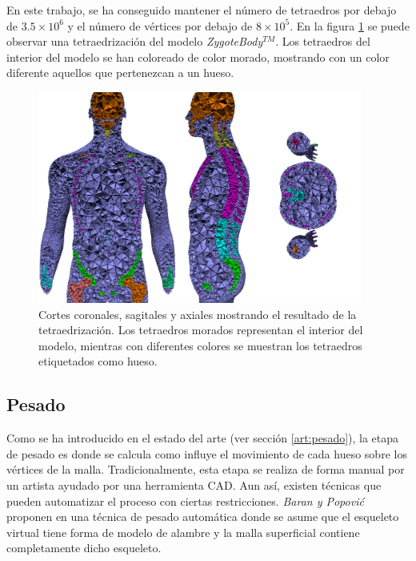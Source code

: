 En este trabajo, se ha conseguido mantener el número de tetraedros por debajo de $3.5\times 10^6$ y el número de vértices por debajo de $8 \times 10^5$. 
En la figura \ref{fig:tetra} se puede observar una tetraedrización del modelo \emph{ZygoteBody}$^{TM}$. Los tetraedros del interior del modelo se han coloreado de color morado, mostrando con un color diferente aquellos que pertenezcan a un hueso.
%
\begin{figure}[th]
   \centering
    \includegraphics[width=0.95\textwidth]{IMG/boneid.png}
     \caption{Cortes coronales, sagitales y axiales mostrando el resultado de la tetraedrización. Los tetraedros morados representan el interior del modelo, mientras con diferentes colores se muestran los tetraedros etiquetados como hueso.}
\label{fig:tetra}
\end{figure} 

\subsection{Pesado}
\label{posing:pesado}
%
Como se ha introducido en el estado del arte (ver sección \ref{art:pesado}), la etapa de pesado es donde se calcula como influye el movimiento de cada hueso sobre los vértices de la malla.
Tradicionalmente, esta etapa se realiza de forma manual por un artista ayudado por una herramienta  \ac{CAD}. Aun así, existen técnicas que pueden automatizar el proceso con ciertas restricciones. \emph{Baran y Popovi\'{c}} proponen en \cite{Baran:2007} una técnica de pesado automática donde se asume que el esqueleto virtual tiene forma de modelo de alambre y la malla superficial contiene completamente dicho esqueleto.

